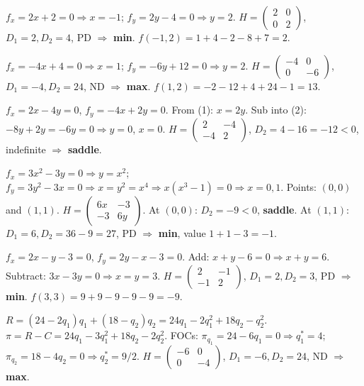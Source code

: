 \begin{solutions}
    \item $f_x = 2 x + 2 = 0 \Rightarrow x = -1$; $f_y = 2 y - 4 = 0 \Rightarrow y = 2$. $H = \begin{pmatrix} 2 & 0 \\ 0 & 2 \end{pmatrix}$, $D_1 = 2, D_2 = 4$, PD $\Rightarrow$ \textbf{min}. $f(-1, 2) = 1 + 4 - 2 - 8 + 7 = 2$.
    \item $f_x = -4 x + 4 = 0 \Rightarrow x = 1$; $f_y = -6 y + 12 = 0 \Rightarrow y = 2$. $H = \begin{pmatrix} -4 & 0 \\ 0 & -6 \end{pmatrix}$, $D_1 = -4, D_2 = 24$, ND $\Rightarrow$ \textbf{max}. $f(1, 2) = -2 - 12 + 4 + 24 - 1 = 13$.
    \item $f_x = 2 x - 4 y = 0$, $f_y = -4 x + 2 y = 0$. From (1): $x = 2 y$. Sub into (2): $-8 y + 2 y = -6 y = 0 \Rightarrow y = 0$, $x = 0$. $H = \begin{pmatrix} 2 & -4 \\ -4 & 2 \end{pmatrix}$, $D_2 = 4 - 16 = -12 < 0$, indefinite $\Rightarrow$ \textbf{saddle}.
    \item $f_x = 3 x^2 - 3 y = 0 \Rightarrow y = x^2$; $f_y = 3 y^2 - 3 x = 0 \Rightarrow x = y^2 = x^4 \Rightarrow x(x^3 - 1) = 0 \Rightarrow x = 0, 1$. Points: $(0, 0)$ and $(1, 1)$. $H = \begin{pmatrix} 6 x & -3 \\ -3 & 6 y \end{pmatrix}$. At $(0, 0)$: $D_2 = -9 < 0$, \textbf{saddle}. At $(1, 1)$: $D_1 = 6, D_2 = 36 - 9 = 27$, PD $\Rightarrow$ \textbf{min}, value $1 + 1 - 3 = -1$.
    \item $f_x = 2 x - y - 3 = 0$, $f_y = 2 y - x - 3 = 0$. Add: $x + y - 6 = 0 \Rightarrow x + y = 6$. Subtract: $3 x - 3 y = 0 \Rightarrow x = y = 3$. $H = \begin{pmatrix} 2 & -1 \\ -1 & 2 \end{pmatrix}$, $D_1 = 2, D_2 = 3$, PD $\Rightarrow$ \textbf{min}. $f(3, 3) = 9 + 9 - 9 - 9 - 9 = -9$.
    \item $R = (24 - 2 q_1) q_1 + (18 - q_2) q_2 = 24 q_1 - 2 q_1^2 + 18 q_2 - q_2^2$. $\pi = R - C = 24 q_1 - 3 q_1^2 + 18 q_2 - 2 q_2^2$. FOCs: $\pi_{q_1} = 24 - 6 q_1 = 0 \Rightarrow q_1^* = 4$; $\pi_{q_2} = 18 - 4 q_2 = 0 \Rightarrow q_2^* = 9/2$. $H = \begin{pmatrix} -6 & 0 \\ 0 & -4 \end{pmatrix}$, $D_1 = -6, D_2 = 24$, ND $\Rightarrow$ \textbf{max}.

\end{solutions}

